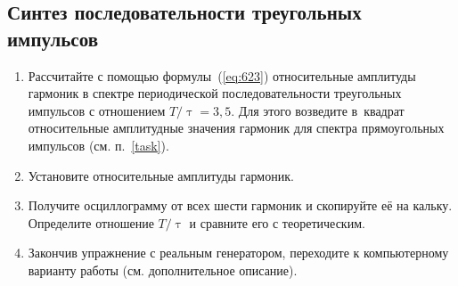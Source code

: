 \begin{lab:task}

\subsection*{Синтез последовательности треугольных импульсов}
\begin{enumerate}
	\item Рассчитайте с помощью формулы~(\ref{eq:623}) относительные амплитуды гармоник в спектре периодической последовательности треугольных импульсов с отношением $T/\uptau=3,5$. Для этого возведите в~квадрат относительные амплитудные значения гармоник для спектра прямоугольных импульсов (см. п.~\ref{task}).
	\item Установите относительные амплитуды гармоник.
	\item Получите осциллограмму от всех шести гармоник и скопируйте её на кальку. Определите отношение $T/\uptau$ и сравните его с теоретическим.
	\item Закончив упражнение с реальным генератором, переходите к компьютерному варианту работы (см. дополнительное описание).
\end{enumerate}




\end{lab:task}
